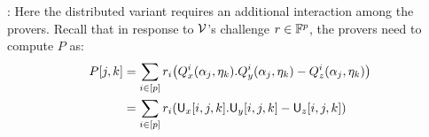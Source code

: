 
: Here the distributed variant requires an additional interaction among the provers. Recall that in response to $\mathcal{V}$'s challenge $r\in \mathbb{F}^p$, the provers need to compute $P$ as:
\begin{align*}
P[j,k] & =\sum_{i\in
[p]}r_i\big(Q_x^i(\alpha_j,\eta_k).Q_y^i(\alpha_j,\eta_k)-Q_z^i(\alpha_j,\eta_k)\big)\\    
& = \sum_{i\in [p]}r_i(\mathsf{U}_x[i,j,k].\mathsf{U}_y[i,j,k] - \mathsf{U}_z[i,j,k])
\end{align*}    


